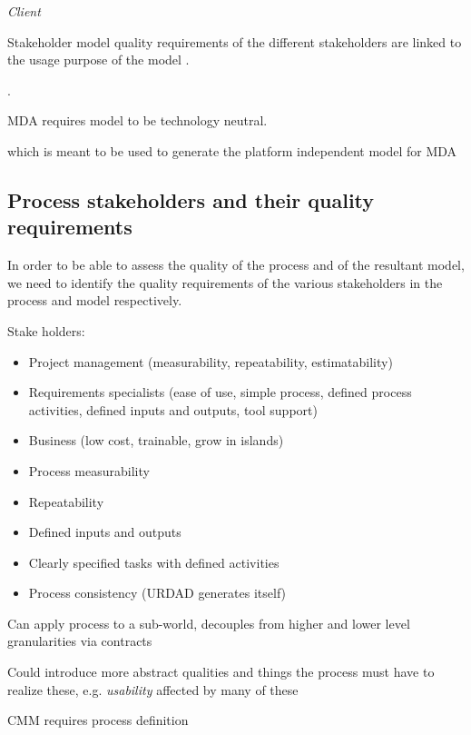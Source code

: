 {\emph{Client}


Stakeholder model quality requirements of the different stakeholders are linked to the usage purpose of the model \cite{lange_christiaan_assessing_2007}. 



\cite{lange_managing_2005,lange_improving_2006}.


MDA requires model to be technology neutral.


which is meant to be used to generate the platform independent model for MDA

\subsection{Process stakeholders and their quality requirements}

In order to be able to assess the quality of the process and of the resultant model, we need to identify the quality requirements of the various stakeholders in the process and model respectively.


\cite{berard_what_1995}

Stake holders:
\begin{itemize}
  \item Project management (measurability, repeatability, estimatability)
  \item Requirements specialists (ease of use, simple process, defined process activities, defined inputs and outputs, tool support)
  \item Business (low cost, trainable, grow in islands)
\end{itemize}


\begin{itemize}
  \item Process measurability
  \item Repeatability
  \item Defined inputs and outputs
  \item Clearly specified tasks with defined activities
  \item Process consistency (URDAD generates itself)
\end{itemize}

Can apply process to a sub-world, decouples from higher and lower level granularities via contracts

Could introduce more abstract qualities and things the process must have to realize these, e.g. \emph{usability} affected by many of these

CMM requires process definition


}
